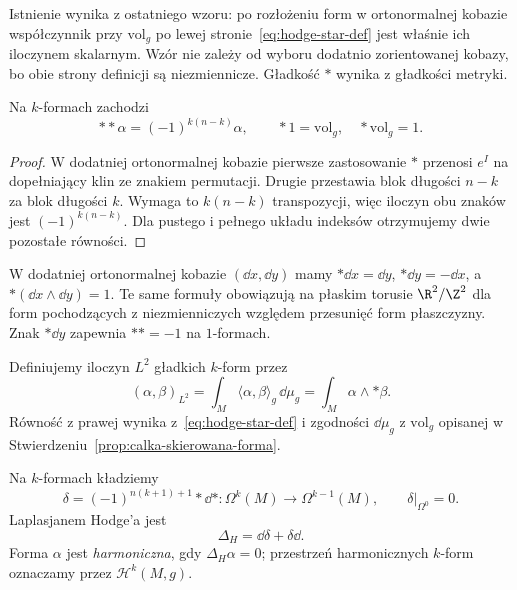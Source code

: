 Istnienie wynika z ostatniego wzoru: po rozłożeniu form w
ortonormalnej kobazie współczynnik przy $\mathrm{vol}_g$
po lewej stronie~\eqref{eq:hodge-star-def} jest właśnie
ich iloczynem skalarnym. Wzór nie zależy od wyboru
dodatnio zorientowanej kobazy, bo obie strony definicji
są niezmiennicze. Gładkość $*$ wynika z gładkości metryki.

\begin{stwierdzenie}
\label{prop:hodge-star-square}
Na $k$-formach zachodzi
\begin{equation}\label{eq:hodge-star-square}
 **\alpha=(-1)^{k(n-k)}\alpha,
 \qquad *1=\mathrm{vol}_g,\quad *\mathrm{vol}_g=1.
\end{equation}
\end{stwierdzenie}
\begin{proof}
W dodatniej ortonormalnej kobazie pierwsze zastosowanie $*$
przenosi $e^I$ na dopełniający klin ze znakiem permutacji.
Drugie przestawia blok długości $n-k$ za blok długości $k$.
Wymaga to $k(n-k)$ transpozycji, więc iloczyn obu znaków
jest $(-1)^{k(n-k)}$. Dla pustego i pełnego układu indeksów
otrzymujemy dwie pozostałe równości.
\end{proof}

\begin{przyklad}
W dodatniej ortonormalnej kobazie $(\dd x,\dd y)$ mamy
$*\dd x=\dd y$, $*\dd y=-\dd x$, a
$*(\dd x\wedge\dd y)=1$. Te same formuły obowiązują na
płaskim torusie $\R^2/\Z^2$ dla form pochodzących z
niezmienniczych względem przesunięć form płaszczyzny.
Znak $*\dd y$ zapewnia $**=-1$ na $1$-formach.
\end{przyklad}

Definiujemy iloczyn $L^2$ gładkich $k$-form przez
\begin{equation}\label{eq:hodge-l2}
 (\alpha,\beta)_{L^2}
 =\int_M\langle\alpha,\beta\rangle_g\,\dd\mu_g
 =\int_M\alpha\wedge*\beta.
\end{equation}
Równość z prawej wynika z~\eqref{eq:hodge-star-def}
i zgodności $\dd\mu_g$ z $\mathrm{vol}_g$ opisanej w
Stwierdzeniu~\ref{prop:calka-skierowana-forma}.

\begin{definicja}
\label{def:hodge-codifferential}
Na $k$-formach kładziemy
\begin{equation}\label{eq:hodge-delta}
 \delta=(-1)^{n(k+1)+1}*\dd*:\Omega^k(M)\longrightarrow
                                     \Omega^{k-1}(M),
 \qquad\delta|_{\Omega^0}=0.
\end{equation}
Laplasjanem Hodge'a jest
\begin{equation}\label{eq:hodge-laplacian}
 \Delta_H=\dd\delta+\delta\dd.
\end{equation}
Forma $\alpha$ jest \emph{harmoniczna}, gdy
$\Delta_H\alpha=0$; przestrzeń harmonicznych $k$-form
oznaczamy przez $\mathcal H^k(M,g)$.
\end{definicja}

